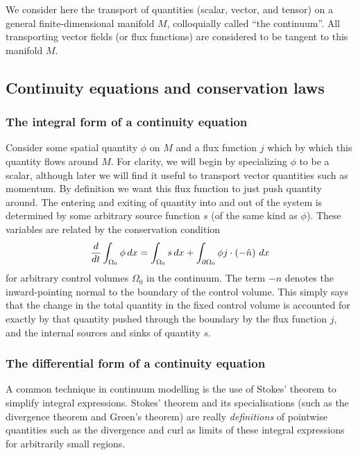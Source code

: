 We consider here the transport of quantities (scalar, vector, and tensor) on a general finite-dimensional manifold $M$,
colloquially called ``the continuum''. All transporting vector fields (or flux functions) are considered to be tangent to this manifold $M$.
\subsection{Continuity equations and conservation laws}\label{conservation_laws}
\subsubsection{The integral form of a continuity equation}
Consider some spatial quantity $\phi$ on $M$ and a flux function $j$ which by which
this quantity flows around $M$. For clarity, we will begin by specializing $\phi$ to be a scalar, although later we will find it useful to
transport vector quantities such as momentum. By definition we want this flux function to just push quantity around.
The entering and exiting of quantity into and out of the system is determined by some arbitrary source function $s$ (of the same kind as $\phi$). These variables are related by the
conservation condition
\begin{equation}\label{continuity_equation}
    \frac{d}{dt} \int_{\Omega_0} \phi\,dx = \int_{\Omega_0} s\,dx + \int_{{\partial\Omega_0}} \phi j \cdot \left(-\hat{n}\right)\,dx
\end{equation}
for arbitrary control volumes $\Omega_0$ in the continuum. The term $-\hat{n}$ denotes the inward-pointing normal to the boundary of the control volume. This simply says that the change in the total quantity in the fixed control volume is accounted for exactly by that quantity pushed through the boundary by the flux function $j$, and the internal sources and sinks of quantity $s$.

\subsubsection{The differential form of a continuity equation}
A common technique in continuum modelling is the use of Stokes' theorem to simplify integral expressions.
Stokes' theorem and its specialisations (such as the divergence theorem and Green's theorem) are really \textit{definitions} of pointwise quantities
such as the divergence and curl as limits of these integral expressions for arbitrarily small regions.

